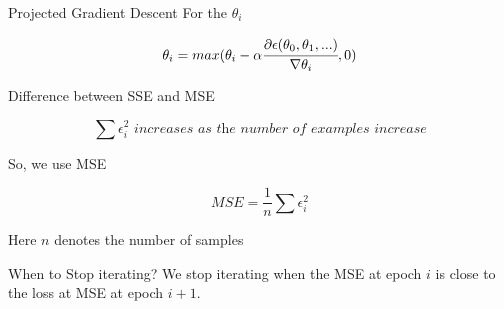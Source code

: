 \documentclass{beamer}
\begin{document}
\begin{frame}{Projected Gradient Descent}
    For the $\theta_{i}$
    
    \begin{equation*}
        \theta_{i} = max(\theta_{i} - \alpha \cfrac{\partial \epsilon (\theta_{0},\theta_{1},...)}{ \nabla  \theta_{i}},0)
    \end{equation*}
\end{frame}

\begin{frame}{Difference between SSE and MSE}
    
    
    
    \begin{equation*}
        \sum \epsilon_{i}^{2} \textit{ increases as the number of examples increase}
    \end{equation*}
    
    So, we use MSE
    
    \begin{equation*}
        \textit{MSE} = \frac{1}{n} \sum \epsilon_{i}^{2}
    \end{equation*}
    
    Here $n$ denotes the number of samples
    
    
    
\end{frame}

\begin{frame}{When to Stop iterating?}
    We stop iterating when the MSE at epoch $i$ is close to the loss at MSE at epoch $i+1$.
\end{frame}
\end{document}
